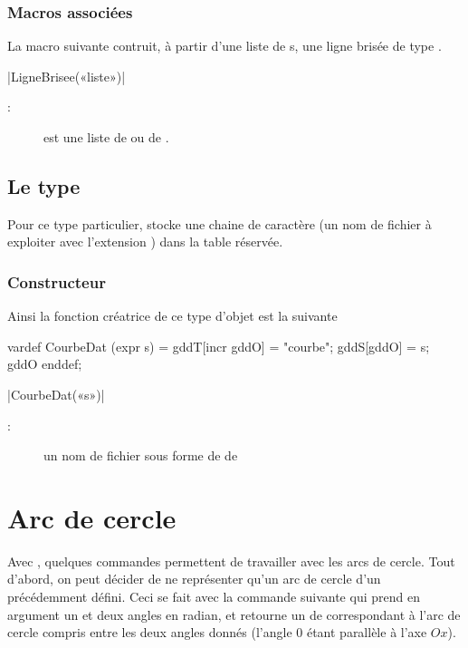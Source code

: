 \documentclass[a4paper,french]{article}
\begin{document}
\subsubsection{Macros associées}

La macro suivante contruit, à partir d'une liste de s, une ligne
brisée de type .

\begin{colourband}
  \macro|LigneBrisee(«liste»)|
  \begin{description}
    \item[:] est une liste de  ou de .
  \end{description}
\end{colourband}
  

\subsection{Le type }

Pour ce type particulier, \mpgeomdd stocke
une chaine de caractère (un nom de fichier à exploiter avec l'extension
) dans la table  réservée.

\subsubsection{Constructeur}

Ainsi la fonction
créatrice de ce type d'objet est la suivante
\begin{mpcode}
vardef CourbeDat (expr s) =
  gddT[incr gddO] = "courbe"; gddS[gddO] = s; gddO
enddef;
\end{mpcode}
\begin{colourband}
\macro|CourbeDat(«s»)|
\begin{description}
  \item[:] un nom de fichier sous forme de  de \MP
\end{description}
\end{colourband}

\bigskip

\section{Arc de cercle}

Avec \mpgeomdd{}, quelques commandes permettent de travailler avec les arcs de
cercle. Tout d'abord, on peut décider de ne représenter qu'un arc de cercle d'un
 précédemment défini. Ceci se fait avec la commande suivante qui
prend en argument un  et deux angles en radian, et retourne un
 de \MP{} correspondant à l'arc de cercle compris entre les deux
angles donnés (l'angle 0 étant parallèle à l'axe $Ox$).
\end{document}
